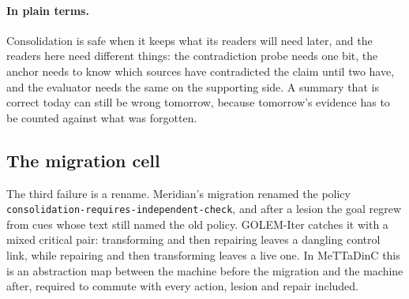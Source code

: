 \documentclass[11pt]{article}
\newcommand{\code}[1]{\texttt{#1}}
\newcommand{\plain}{\paragraph{In plain terms.}}
\theoremstyle{definition}
\theoremstyle{plain}
\begin{document}
\plain Consolidation is safe when it keeps what its readers will need later, and the readers here
need different things: the contradiction probe needs one bit, the anchor needs to know which
sources have contradicted the claim until two have, and the evaluator needs the same on the
supporting side. A summary that is correct today can still be wrong tomorrow, because tomorrow's
evidence has to be counted against what was forgotten.

\subsection{The migration cell}\label{sec:cell}

The third failure is a rename. Meridian's migration renamed the policy
\code{consolidation-\allowbreak requires-\allowbreak independent-\allowbreak check}, and after a lesion the goal regrew from cues whose
text still named the old policy. GOLEM-Iter catches it with a mixed critical pair: transforming and
then repairing leaves a dangling control link, while repairing and then transforming leaves a live
one. In MeTTaDinC this is an abstraction map between the machine before the migration and the
machine after, required to commute with every action, lesion and repair included.
\end{document}
